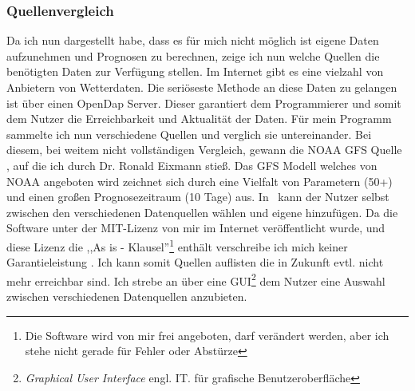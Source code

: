 \subsubsection{Quellenvergleich} %
Da ich nun dargestellt habe, dass es für mich nicht möglich ist eigene Daten aufzunehmen und Prognosen zu berechnen, zeige ich nun welche Quellen die benötigten Daten zur Verfügung stellen.
Im Internet gibt es eine vielzahl von Anbietern von Wetterdaten.
Die seriöseste Methode an diese Daten zu gelangen ist über einen OpenDap Server.
Dieser garantiert dem Programmierer und somit dem Nutzer die Erreichbarkeit und Aktualität der Daten.
Für mein Programm sammelte ich nun verschiedene Quellen und verglich sie untereinander.
Bei diesem, bei weitem nicht vollständigen Vergleich,
gewann die NOAA GFS Quelle \cite{noaa} , auf die ich durch Dr. Ronald Eixmann stieß.
Das GFS \cite{gfs} Modell welches von NOAA angeboten wird zeichnet sich durch eine Vielfalt von Parametern (50+) und einen großen Prognosezeitraum (10 Tage) aus.
In \vs\ kann der Nutzer selbst zwischen den verschiedenen Datenquellen wählen und eigene hinzufügen.
Da die Software unter der MIT-Lizenz von mir im Internet veröffentlicht wurde, und diese Lizenz die ,,As is - Klausel''\footnote{Die Software wird von mir frei angeboten, darf verändert werden, aber ich stehe nicht gerade für Fehler oder Abstürze} enthält verschreibe ich mich keiner Garantieleistung \cite{mitl}. Ich kann somit Quellen auflisten die in Zukunft evtl. nicht mehr erreichbar sind.
Ich strebe an über eine GUI\footnote{\textit{Graphical User Interface} engl. IT. für grafische Benutzeroberfläche} dem Nutzer eine Auswahl zwischen verschiedenen Datenquellen anzubieten.


